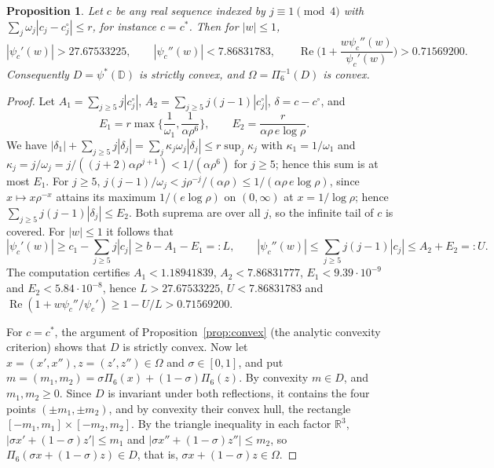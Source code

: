 \documentclass[11pt]{amsart}
\newtheorem{proposition}[theorem]{Proposition}
\theoremstyle{definition}
\theoremstyle{remark}
\numberwithin{equation}{section}
\newcommand{\R}{\mathbb{R}}
\newcommand{\D}{\mathbb{D}}
\DeclareMathOperator{\re}{Re}
\begin{document}
\begin{proposition}\label{prop:convex6}
Let $c$ be any real sequence indexed by $j\equiv1\pmod4$ with $\sum_j\omega_j|c_j-c^\circ_j|\leq r$, for instance $c=c^*$. Then for $|w|\leq1$,
\[
|\psi_c'(w)|>27.67533225,\qquad|\psi_c''(w)|<7.86831783,\qquad\re\Big(1+\frac{w\psi_c''(w)}{\psi_c'(w)}\Big)>0.71569200 .
\]
Consequently $D=\psi^*(\D)$ is strictly convex, and $\Omega=\Pi_6^{-1}(D)$ is convex.
\end{proposition}

\begin{proof}
Let $A_1=\sum_{j\geq5}j|c^\circ_j|$, $A_2=\sum_{j\geq5}j(j-1)|c^\circ_j|$, $\delta=c-c^\circ$, and
\[
E_1=r\max\Big\{\frac1{\omega_1},\frac1{\alpha\rho^6}\Big\},\qquad E_2=\frac r{\alpha\rho\,e\log\rho}.
\]
We have $|\delta_1|+\sum_{j\geq5}j|\delta_j|=\sum_j\kappa_j\omega_j|\delta_j|\leq r\sup_j\kappa_j$ with $\kappa_1=1/\omega_1$ and $\kappa_j=j/\omega_j=j/((j+2)\alpha\rho^{j+1})<1/(\alpha\rho^6)$ for $j\geq5$; hence this sum is at most $E_1$. For $j\geq5$, $j(j-1)/\omega_j<j\rho^{-j}/(\alpha\rho)\leq1/(\alpha\rho\,e\log\rho)$, since $x\mapsto x\rho^{-x}$ attains its maximum $1/(e\log\rho)$ on $(0,\infty)$ at $x=1/\log\rho$; hence $\sum_{j\geq5}j(j-1)|\delta_j|\leq E_2$. Both suprema are over all $j$, so the infinite tail of $c$ is covered. For $|w|\leq1$ it follows that
\[
|\psi_c'(w)|\geq c_1-\sum_{j\geq5}j|c_j|\geq b-A_1-E_1=:L,\qquad|\psi_c''(w)|\leq\sum_{j\geq5}j(j-1)|c_j|\leq A_2+E_2=:U .
\]
The computation certifies $A_1<1.18941839$, $A_2<7.86831777$, $E_1<9.39\cdot10^{-9}$ and $E_2<5.84\cdot10^{-8}$, hence $L>27.67533225$, $U<7.86831783$ and $\re(1+w\psi_c''/\psi_c')\geq1-U/L>0.71569200$.

For $c=c^*$, the argument of Proposition~\ref{prop:convex} (the analytic convexity criterion) shows that $D$ is strictly convex. Now let $x=(x',x''),z=(z',z'')\in\Omega$ and $\sigma\in[0,1]$, and put $m=(m_1,m_2)=\sigma\Pi_6(x)+(1-\sigma)\Pi_6(z)$. By convexity $m\in D$, and $m_1,m_2\geq0$. Since $D$ is invariant under both reflections, it contains the four points $(\pm m_1,\pm m_2)$, and by convexity their convex hull, the rectangle $[-m_1,m_1]\times[-m_2,m_2]$. By the triangle inequality in each factor $\R^3$, $|\sigma x'+(1-\sigma)z'|\leq m_1$ and $|\sigma x''+(1-\sigma)z''|\leq m_2$, so $\Pi_6(\sigma x+(1-\sigma)z)\in D$, that is, $\sigma x+(1-\sigma)z\in\Omega$.
\end{proof}
\end{document}
